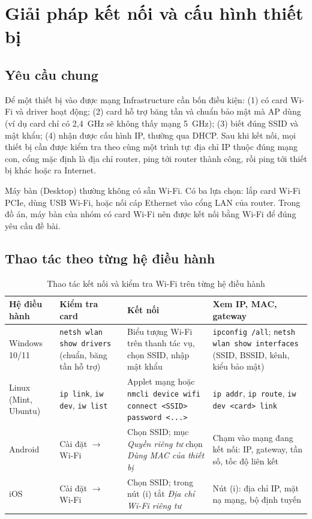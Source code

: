 \documentclass[12pt,a4paper]{article}
\numberwithin{figure}{section}
\numberwithin{table}{section}
\newcommand{\mono}[1]{\texttt{#1}}
\begin{document}
\section{Giải pháp kết nối và cấu hình thiết bị}
\label{sec:giaiphap}

\subsection{Yêu cầu chung}
Để một thiết bị vào được mạng Infrastructure cần bốn điều kiện: (1) có card
Wi-Fi và driver hoạt động; (2) card hỗ trợ băng tần và chuẩn bảo mật mà AP
dùng (ví dụ card chỉ có 2,4~GHz sẽ không thấy mạng 5~GHz); (3) biết đúng SSID
và mật khẩu; (4) nhận được cấu hình IP, thường qua DHCP. Sau khi kết nối, mọi
thiết bị cần được kiểm tra theo cùng một trình tự: địa chỉ IP thuộc đúng mạng
con, cổng mặc định là địa chỉ router, ping tới router thành công, rồi ping tới
thiết bị khác hoặc ra Internet.

Máy bàn (Desktop) thường không có sẵn Wi-Fi. Có ba lựa chọn: lắp card Wi-Fi
PCIe, dùng USB Wi-Fi, hoặc nối cáp Ethernet vào cổng LAN của router. Trong đồ
án, máy bàn của nhóm có card Wi-Fi nên được kết nối bằng Wi-Fi để đúng yêu cầu
đề bài.

\subsection{Thao tác theo từng hệ điều hành}
\begin{table}[H]
  \centering\small
  \caption{Thao tác kết nối và kiểm tra Wi-Fi trên từng hệ điều hành}
  \label{tab:hedieuhanh}
  \begin{tabularx}{\linewidth}{@{}P{2.0cm} L L L@{}}
    \toprule
    \textbf{Hệ điều hành} & \textbf{Kiểm tra card} & \textbf{Kết nối} &
    \textbf{Xem IP, MAC, gateway}\\
    \midrule
    Windows 10/11 & \mono{netsh wlan show drivers} (chuẩn, băng tần hỗ trợ) &
    Biểu tượng Wi-Fi trên thanh tác vụ, chọn SSID, nhập mật khẩu &
    \mono{ipconfig /all}; \mono{netsh wlan show interfaces} (SSID, BSSID, kênh,
    kiểu bảo mật)\\
    Linux (Mint, Ubuntu) & \mono{ip link}, \mono{iw dev}, \mono{iw list} &
    Applet mạng hoặc \mono{nmcli device wifi connect <SSID> password <...>} &
    \mono{ip addr}, \mono{ip route}, \mono{iw dev <card> link}\\
    Android & Cài đặt $\rightarrow$ Wi-Fi &
    Chọn SSID; mục \emph{Quyền riêng tư} chọn \emph{Dùng MAC của thiết bị} &
    Chạm vào mạng đang kết nối: IP, gateway, tần số, tốc độ liên kết\\
    iOS & Cài đặt $\rightarrow$ Wi-Fi &
    Chọn SSID; trong nút (i) tắt \emph{Địa chỉ Wi-Fi riêng tư} &
    Nút (i): địa chỉ IP, mặt nạ mạng, bộ định tuyến\\
    \bottomrule
  \end{tabularx}
\end{table}
\end{document}
